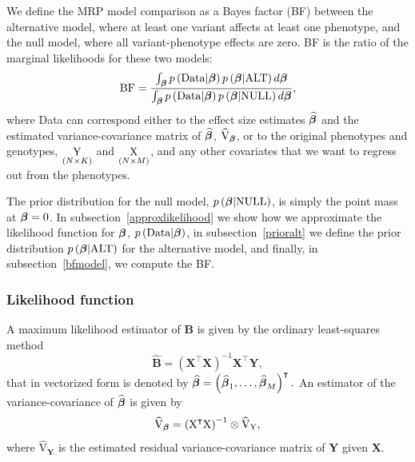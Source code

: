 We define the MRP model comparison as a Bayes factor (BF) between the alternative model, where at least one variant
affects at least one phenotype, and the null model, where all variant-phenotype effects are zero.  
BF is the ratio of the marginal likelihoods for these two models: 
$$ \textrm{BF} = \frac{\int_{{\boldsymbol {\beta}}}p\left(\mathbf{\textrm{Data}}|{\boldsymbol {\beta}}\right)p\left({\boldsymbol {\beta}}|\textrm{ALT}\right)d{\boldsymbol {\beta}}}{\int_{{\boldsymbol {\beta}}}p\left(\mathbf{\textrm{Data}}|{\boldsymbol {\beta}}\right)p\left({\boldsymbol {\beta}}|\textrm{NULL}\right)d{\boldsymbol {\beta}}},$$ 
where Data can correspond either to the effect size estimates $\boldsymbol {\widehat{ \beta}}$ and the estimated variance-covariance matrix of  $\boldsymbol {\widehat{ \beta}}$, $\widehat{\mathbf{\textrm{V}}}_{\boldsymbol{\beta}}$, or to the original phenotypes and genotypes, 
$\underset{\left(N\times K\right)}{\mathbf{\textrm{\textrm{Y}}}}$ and $ \underset{\left(N\times M\right)}{\mathbf{\textrm{\textrm{X}}}}$, and any other covariates that we
want to regress out from the phenotypes. 

The prior distribution for the null model, $p\left({\boldsymbol {\beta}}|\textrm{NULL}\right)$, is simply the point mass at $\boldsymbol \beta = 0$.
In subsection~\ref{approxlikelihood} we show how we approximate the likelihood function for $\boldsymbol \beta$, $p\left(\mathbf{\textrm{Data}} | {\boldsymbol {\beta}}\right)$,
in subsection~\ref{prioralt} we define the prior distribution $p\left({\boldsymbol {\beta}}|\textrm{ALT}\right)$ for the alternative model, 
and finally, in subsection~\ref{bfmodel}, we compute the BF.

\subsubsection*{Likelihood function} 
\label{approxlikelihood}
A maximum likelihood estimator of $\mathbf{\textrm{B}}$ is given by the ordinary least-squares method
$$\widehat{\mathbf{\textrm{B}}} = \left(\mathbf{\textrm{X}}^\intercal\mathbf{\textrm{X}}\right)^{-1}\mathbf{\textrm{X}}^{\intercal}\mathbf{\textrm{Y}},$$
that in vectorized form is denoted by   
$\boldsymbol {\widehat{ \beta}} = \left(\boldsymbol {\widehat{ \beta}}_{1},\dots,\boldsymbol {\widehat{\beta}}_{M}\right)^{\intercal}.$
An estimator of the variance-covariance of $\widehat{\boldsymbol \beta}$  is given by 
$$\widehat{\textrm{V}}_{\mathbf{\boldsymbol \beta}} =  \left(\mathbf{\textrm{X}}^\intercal\mathbf{\textrm{X}}\right)^{-1}\otimes \widehat{\textrm{V}}_{\mathbf{\textrm{Y}}},$$
where $\widehat{\textrm{V}}_{\mathbf{\textrm{Y}}}$ is the estimated residual variance-covariance matrix of $\mathbf{\textrm{Y}}$ given $\mathbf{\textrm{X}}$. 

